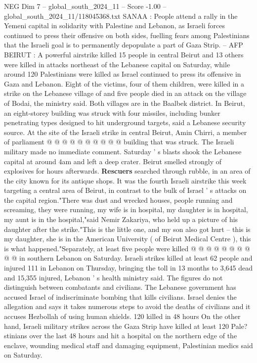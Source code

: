 \begin{textsample}{NEG Dim 7 – global\_south\_2024\_11 – Score -1.00 – global\_south\_2024\_11/118045368.txt}  \label{ex:f7_neg_311}
SANAA : People attend a rally in the Yemeni capital in solidarity with Palestine and Lebanon, as Israeli forces continued to press their offensive on both sides, fuelling fears among Palestinians that the Israeli goal is to permanently depopulate a part of Gaza Strip. -- AFP BEIRUT : A powerful airstrike killed 15 people in central Beirut and 13 others were killed in attacks northeast of the Lebanese capital on Saturday, while around 120 Palestinians were killed as Israel continued to press its offensive in Gaza and Lebanon.
Eight of the victims, four of them children, were killed in a strike on the Lebanese village of and five people died in an attack on the village of Bodai, the ministry said.
Both villages are in the Baalbek district.
In Beirut, an eight-storey building was struck with four missiles, including bunker penetrating types designed to hit underground targets, said a Lebanese security source.
At the site of the Israeli strike in central Beirut, Amin Chirri, a member of parliament @ @ @ @ @ @ @ @ @ @ building that was struck.
The Israeli military made no immediate comment.
Saturday ' s blasts shook the Lebanese capital at around 4am and left a deep crater.
Beirut smelled strongly of explosives for hours afterwards. \textbf{Rescuers} searched through rubble, in an area of the city known for its antique shops.
It was the fourth Israeli airstrike this week targeting a central area of Beirut, in contrast to the bulk of Israel ' s attacks on the capital region."There was dust and wrecked houses, people running and screaming, they were running, my wife is in hospital, my daughter is in hospital, my aunt is in the hospital,"said Nemir Zakariya, who held up a picture of his daughter after the strike."This is the little one, and my son also got hurt -- this is my daughter, she is in the American University ( of Beirut Medical Centre ), this is what happened."Separately, at least five people were killed @ @ @ @ @ @ @ @ @ @ in southern Lebanon on Saturday.
Israeli strikes killed at least 62 people and injured 111 in Lebanon on Thursday, bringing the toll in 13 months to 3,645 dead and 15,355 injured, Lebanon ' s health ministry said.
The figures do not distinguish between combatants and civilians.
The Lebanese government has accused Israel of indiscriminate bombing that kills civilians.
Israel denies the allegation and says it takes numerous steps to avoid the deaths of civilians and it accuses Hezbollah of using human shields. 120 killed in 48 hours On the other hand, Israeli military strikes across the Gaza Strip have killed at least 120 Pale? stinians over the last 48 hours and hit a hospital on the northern edge of the enclave, wounding medical staff and damaging equipment, Palestinian medics said on Saturday.

\end{textsample}
